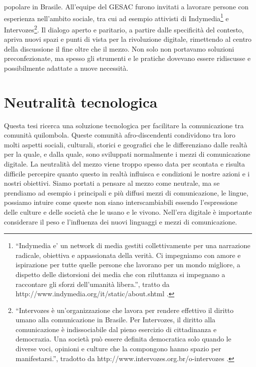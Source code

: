 popolare in Brasile. All'equipe del GESAC furono invitati a lavorare
persone con esperienza nell'ambito sociale, tra cui ad esempio
attivisti di Indymedia\footnote{``Indymedia e' un network di media
  gestiti collettivamente per una narrazione radicale, obiettiva e
  appassionata della verità. Ci impegniamo con amore e ispirazione per
  tutte quelle persone che lavorano per un mondo migliore, a dispetto
  delle distorsioni dei media che con riluttanza si impegnano a
  raccontare gli sforzi dell'umanità libera.'', tratto da
  http://www.indymedia.org/it/static/about.shtml .} e
Intervozes\footnote{``Intervozes è un'organizzazione che lavora per
  rendere effettivo il diritto umano alla comunicazione in Brasile.
  Per Intervozes, il diritto alla comunicazione è indissociabile dal
  pieno esercizio di cittadinanza e democrazia. Una società può essere
  definita democratica solo quando le diverse voci, opinioni e culture
  che la compongono hanno spazio per manifestarsi.'', tradotto da
  http://www.intervozes.org.br/o-intervozes .}. Il dialogo aperto e
paritario, a partire dalle specificità del contesto, apriva nuovi
spazi e punti di vista per la rivoluzione digitale, rimettendo al
centro della discussione il fine oltre che il mezzo. Non solo non
portavamo soluzioni preconfezionate, ma spesso gli strumenti e le
pratiche dovevano essere ridiscusse e possibilmente adattate a nuove
necessità.

\section{Neutralità tecnologica}
Questa tesi ricerca una soluzione tecnologica per facilitare la
comunicazione tra comunità quilombola. Queste comunità
afro-discendenti condividono tra loro molti aspetti sociali,
culturali, storici e geografici che le differenziano dalle realtà per
la quale, e dalla quale, sono sviluppati normalmente i mezzi di
comunicazione digitale. La neutralità del mezzo viene troppo spesso
data per scontata e risulta difficile percepire quanto questo in
realtà influisca e condizioni le nostre azioni e i nostri
obiettivi. Siamo portati a pensare al mezzo come neutrale, ma se
prendiamo ad esempio i principali e più diffusi mezzi di
comunicazione, le lingue, possiamo intuire come queste non siano
interscambiabili essendo l'espressione delle culture e delle società
che le usano e le vivono. Nell'era digitale è importante considerare
il peso e l'influenza dei nuovi linguaggi e mezzi di comunicazione.

